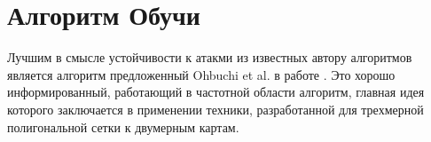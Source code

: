 \section{Алгоритм Обучи}
\label{sec:base}

Лучшим в смысле устойчивости к атакми из известных автору алгоритмов является алгоритм предложенный 
Ohbuchi et al. в работе \cite{Ohbuchi}. Это хорошо информированный, работающий в частотной области алгоритм,
главная идея которого заключается в применении техники, разработанной для трехмерной полигональной сетки к
двумерным картам.
